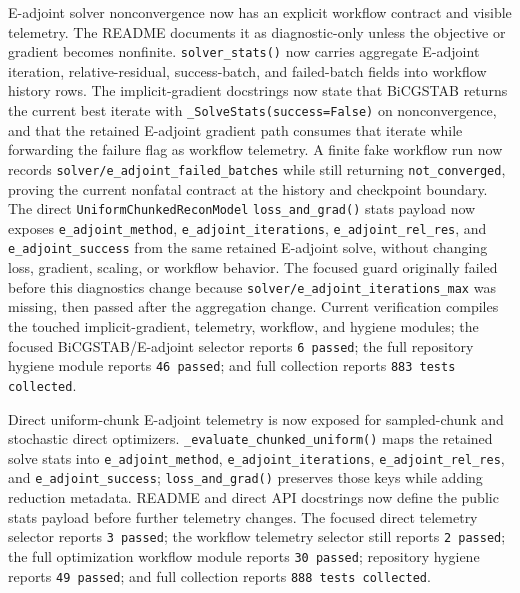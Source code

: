 \documentclass[11pt]{article}
\begin{document}
E-adjoint solver nonconvergence now has an explicit workflow contract and
visible telemetry.  The README documents it as diagnostic-only unless the
objective or gradient becomes nonfinite.  \texttt{solver\_stats()} now carries
aggregate E-adjoint iteration, relative-residual, success-batch, and
failed-batch fields into workflow history rows.  The implicit-gradient
docstrings now state that BiCGSTAB returns the current best iterate with
\texttt{\_SolveStats(success=False)} on nonconvergence, and that the retained
E-adjoint gradient path consumes that iterate while forwarding the failure flag
as workflow telemetry.  A finite fake workflow run now records
\texttt{solver/e\_adjoint\_failed\_batches} while still returning
\texttt{not\_converged}, proving the current nonfatal contract at the history
and checkpoint boundary.  The direct \texttt{UniformChunkedReconModel}
\texttt{loss\_and\_grad()} stats payload now exposes
\texttt{e\_adjoint\_method}, \texttt{e\_adjoint\_iterations},
\texttt{e\_adjoint\_rel\_res}, and \texttt{e\_adjoint\_success} from the same
retained E-adjoint solve, without changing loss, gradient, scaling, or workflow
behavior.  The focused guard originally failed before this
diagnostics change because \texttt{solver/e\_adjoint\_iterations\_max} was
missing, then passed after the aggregation change.  Current verification
compiles the touched implicit-gradient, telemetry, workflow, and hygiene
modules; the focused BiCGSTAB/E-adjoint selector reports \texttt{6 passed};
the full repository hygiene module reports \texttt{46 passed}; and full
collection reports \texttt{883 tests collected}.

Direct uniform-chunk E-adjoint telemetry is now exposed for sampled-chunk and
stochastic direct optimizers.  \texttt{\_evaluate\_chunked\_uniform()} maps the
retained solve stats into \texttt{e\_adjoint\_method},
\texttt{e\_adjoint\_iterations}, \texttt{e\_adjoint\_rel\_res}, and
\texttt{e\_adjoint\_success}; \texttt{loss\_and\_grad()} preserves those keys
while adding reduction metadata.  README and direct API docstrings now define
the public stats payload before further telemetry changes.  The focused direct
telemetry selector reports \texttt{3 passed}; the workflow telemetry selector
still reports \texttt{2 passed}; the full optimization workflow module reports
\texttt{30 passed}; repository hygiene reports \texttt{49 passed}; and full
collection reports \texttt{888 tests collected}.
\end{document}
